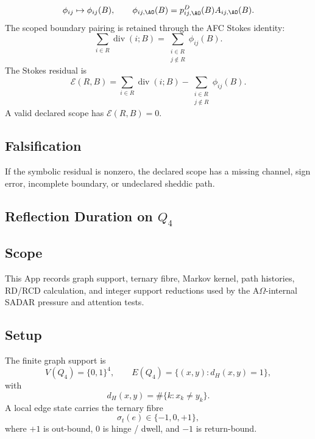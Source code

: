 \[
\phi_{ij}\mapsto \phi_{ij}(B),
\qquad
\phi_{ij,\AO}(B)=p^D_{ij,\AO}(B)A_{ij,\AO}(B).
\]
The scoped boundary pairing is retained through the AFC Stokes identity:
\begin{equation}
\sum_{i\in R}\operatorname{div}(i;B)
=
\sum_{\substack{i\in R\\j\notin R}}\phi_{ij}(B).
\label{app:scoped-flux:eq:afc-pairing}
\end{equation}
The Stokes residual is
\begin{equation}
\mathcal E(R,B)
=
\sum_{i\in R}\operatorname{div}(i;B)
-
\sum_{\substack{i\in R\\j\notin R}}\phi_{ij}(B).
\label{app:scoped-flux:eq:residual}
\end{equation}
A valid declared scope has \(\mathcal E(R,B)=0\).

\subsection{Falsification}
\label{app:scoped-flux:falsification}
If the symbolic residual is nonzero, the declared scope has a missing channel, sign error, incomplete boundary, or undeclared sheddic path.


\subsection{Reflection Duration on \texorpdfstring{\(Q_4\)}{Q4}}
\label{app:combinatorics-rd-tests}

\subsection{Scope}
\label{app:rd-tests:scope}
This App records graph support, ternary fibre, Markov kernel, path histories, RD/RCD calculation, and integer support reductions used by the A\(\Omega\)-internal SADAR pressure and attention tests.

\subsection{Setup}
\label{app:rd-tests:setup}
The finite graph support is
\[
V(Q_4)=\{0,1\}^4,
\qquad
E(Q_4)=\{(x,y):d_H(x,y)=1\},
\]
with
\[
d_H(x,y)=\#\{k:x_k\ne y_k\}.
\]
A local edge state carries the ternary fibre
\[
\sigma_t(e)\in\{-1,0,+1\},
\]
where \(+1\) is out-bound, \(0\) is hinge / dwell, and \(-1\) is return-bound.

